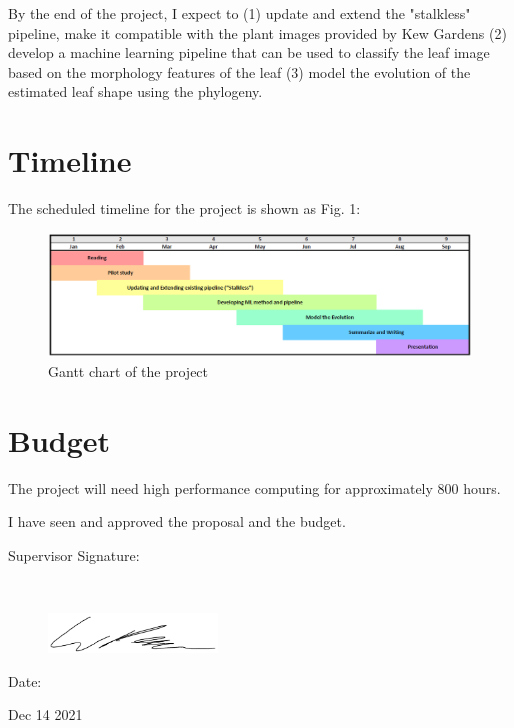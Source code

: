 \documentclass[11pt]{article}
\begin{document}
By the end of the project, I expect to (1) update and extend the "stalkless" pipeline, make it compatible with the plant images provided by Kew Gardens (2) develop a machine learning pipeline that can be used to classify the leaf image based on the morphology features of the leaf (3) model the evolution of the estimated leaf shape using the phylogeny. 

\nolinenumbers
\section*{Timeline}
\linenumbers

The scheduled timeline for the project is shown as Fig. 1:

\begin{figure}[h]
    \centering
    \includegraphics[width=1\textwidth]{Gantt_chart.png}
    \caption{Gantt chart of the project}
\end{figure}

\nolinenumbers
\section*{Budget}
\linenumbers

The project will need high performance computing for approximately 800 hours.

\nolinenumbers







  

\newpage

\begin{center}
\begin{Large}I have seen and approved the proposal and the budget.\\[3ex]\end{Large}
\end{center}
\begin{Large}Supervisor Signature:\end{Large}
\\[3ex]
\begin{figure}[h]
\begin{flushright}
    \includegraphics[width=0.4\textwidth]{will_pearse_signature.png}
    \end{flushright}
\end{figure}


\begin{flushright}
\begin{Large}Date: \end{Large}Dec 14 2021
    \end{flushright}
\end{document}
